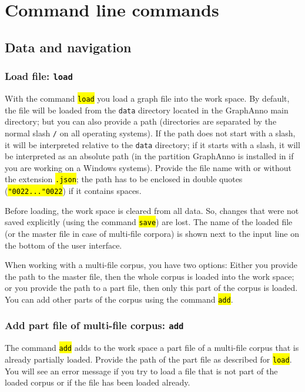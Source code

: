 \documentclass[12pt]{scrartcl}
\newcommand{\quo}{\char"0022}
\newcommand{\code}[1]{\hl{\texttt{#1}}}
\begin{document}
\section{Command line commands}\label{commandline-commands}

\subsection{Data and navigation}\label{data-and-navigation}

\subsubsection{Load file: \texttt{load}}

With the command \code{load} you load a graph file into the work space.
By default, the file will be loaded from the \texttt{data} directory located in the GraphAnno main directory; but you can also provide a path (directories are separated by the normal slash \texttt{/} on all operating systems).
If the path does not start with a slash, it will be interpreted relative to the \texttt{data} directory; if it starts with a slash, it will be interpreted as an absolute path (in the partition GraphAnno is installed in if you are working on a Windows systems).
Provide the file name with or without the extension \code{.json}; the path has to be enclosed in double quotes (\code{\quo...\quo}) if it contains spaces.

Before loading, the work space is cleared from all data.
So, changes that were not saved explicitly (using the command \code{save}) are lost.
The name of the loaded file (or the master file in case of multi-file corpora) is shown next to the input line on the bottom of the user interface.

When working with a multi-file corpus, you have two options:
Either you provide the path to the master file, then the whole corpus is loaded into the work space; or you provide the path to a part file, then only this part of the corpus is loaded.
You can add other parts of the corpus using the command \code{add}.


\subsubsection{Add part file of multi-file corpus: \texttt{add}}

The command \code{add} adds to the work space a part file of a multi-file corpus that is already partially loaded.
Provide the path of the part file as described for \code{load}.
You will see an error message if you try to load a file that is not part of the loaded corpus or if the file has been loaded already.
\end{document}
